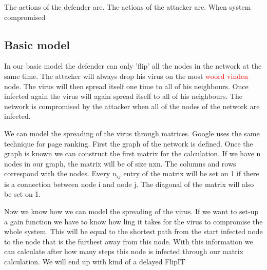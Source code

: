 \documentclass[a4paper, 11pt]{article}
\newcommand{\comment}[1]{\textcolor{red}{#1}\\}
\begin{document}
 The actions of the defender are. The actions of the attacker are. When system compromised
 
 \subsection{Basic model}
 In our basic model the defender can only 'flip' all the nodes in the network at the same time. The attacker will always drop his virus on the most \comment{woord vinden} node. The virus will then spread itself one time to all of his neighbours. Once infected again the virus will again spread itself to all of his neighbours. The network is compromised by the attacker when all of the nodes of the network are infected. 
 
 We can model the spreading of the virus through matrices. Google uses the same technique for page ranking. First the graph of the network is defined. Once the graph is known we can construct the first matrix for the calculation. If we have n nodes in our graph, the matrix will be of size nxn. The columns and rows correspond with the nodes. Every $n_{ij}$ entry of the matrix will be set on 1 if there is a connection between node i and node j. The diagonal of the matrix will also be set on 1.
 
 Now we know how we can model the spreading of the virus. If we want to set-up a gain function we have to know how ling it takes for the virus to compromise the whole system. This will be equal to the shortest path from the start infected node to the node that is the furthest away from this node. With this information we can calculate after how many steps this node is infected through our matrix calculation. We will end up with kind of a delayed FlipIT
\end{document}
